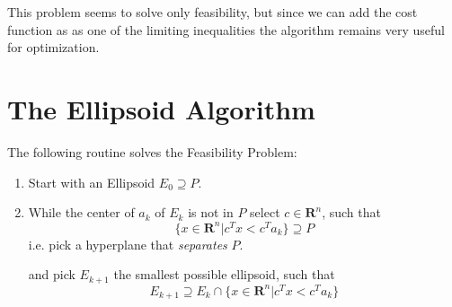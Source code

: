 \documentclass[10pt]{article}
\newcommand{\R}{\mathbf{R}}
\newcommand{\transpose}{T}
\begin{document}
This problem seems to solve only feasibility, but since we can add the cost function as as one of the limiting inequalities the algorithm remains very useful for optimization.

\section{The Ellipsoid Algorithm}
The following routine solves the Feasibility Problem:
\begin{enumerate}
\item Start with an Ellipsoid $E_0 \supseteq P$. 
\item While the center of $a_k$ of $E_k$ is not in $P$ select $c \in \R^n$, such that
\[
\{x \in \R^n | c^\transpose x < c^\transpose a_k \} \supseteq P
\]
i.e. pick a hyperplane that \emph{separates} $P$.

and pick $E_{k+1}$ the smallest possible ellipsoid, such that
\[
E_{k+1} \supseteq E_k \cap \{x \in \R^n | c^\transpose x < c^\transpose a_k \}
\]
\end{enumerate}
\end{document}
